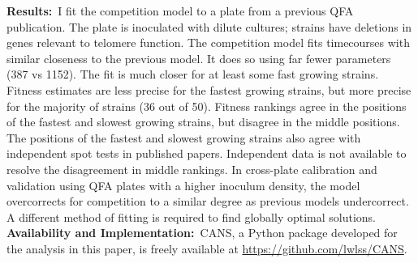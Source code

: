 \textbf{Results:}~I fit the competition model to a plate from a
previous QFA publication. The plate is inoculated with dilute
cultures; strains have deletions in genes relevant to telomere
function. The competition model fits timecourses with similar
closeness to the previous model. It does so using far fewer parameters
(387 vs 1152). The fit is much closer for at least some fast growing
strains. Fitness estimates are less precise for the fastest growing
strains, but more precise for the majority of strains (36 out of
50). Fitness rankings agree in the positions of the fastest and
slowest growing strains, but disagree in the middle positions. The
positions of the fastest and slowest growing strains also agree with
independent spot tests in published papers. Independent data is not
available to resolve the disagreement in middle rankings. In
cross-plate calibration and validation using QFA plates with a higher
inoculum density, the model overcorrects for competition to a similar
degree as previous models undercorrect. A different method of fitting
is required to find globally optimal solutions.
\\
\textbf{Availability and Implementation:}~CANS, a Python package
developed for the analysis in this paper, is freely available at
\href{https://github.com/lwlss/CANS}{https://github.com/lwlss/CANS}.
